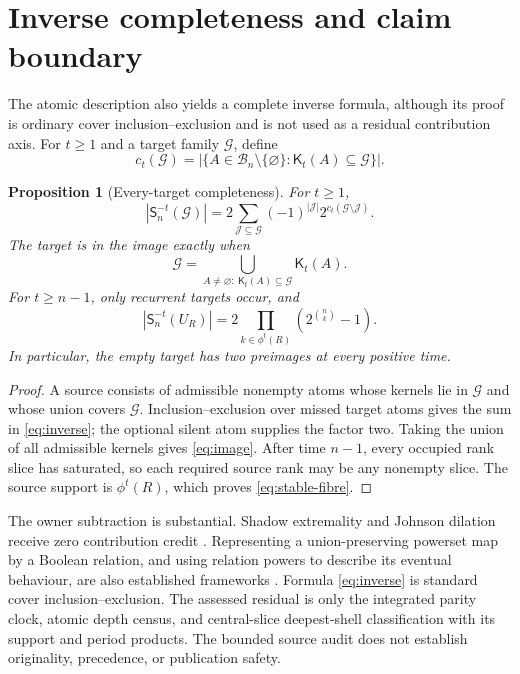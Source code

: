 \documentclass[a4paper,10pt]{amsart}
\newtheorem{proposition}[theorem]{Proposition}
\newcommand{\cB}{\mathcal B}
\newcommand{\cG}{\mathcal G}
\newcommand{\cJ}{\mathcal J}
\newcommand{\cS}{\mathsf S}
\newcommand{\cK}{\mathsf K}
\begin{document}
\section{Inverse completeness and claim boundary}

The atomic description also yields a complete inverse formula, although its
proof is ordinary cover inclusion--exclusion and is not used as a residual
contribution axis.  For $t\geq1$ and a target family $\cG$, define
\[
 c_t(\cG)=|\{A\in\cB_n\setminus\{\varnothing\}:\cK_t(A)\subseteq\cG\}|.
\]

\begin{proposition}[Every-target completeness]\label{prop:inverse}
For $t\geq1$,
\begin{equation}\label{eq:inverse}
 |\cS_n^{-t}(\cG)|=
 2\sum_{\cJ\subseteq\cG}(-1)^{|\cJ|}2^{c_t(\cG\setminus\cJ)}.
\end{equation}
The target is in the image exactly when
\begin{equation}\label{eq:image}
 \cG=\bigcup_{A\neq\varnothing:\ \cK_t(A)\subseteq\cG}\cK_t(A).
\end{equation}
For $t\geq n-1$, only recurrent targets occur, and
\begin{equation}\label{eq:stable-fibre}
 |\cS_n^{-t}(U_R)|=
 2\prod_{k\in\phi^t(R)}\left(2^{\binom nk}-1\right).
\end{equation}
In particular, the empty target has two preimages at every positive time.
\end{proposition}

\begin{proof}
A source consists of admissible nonempty atoms whose kernels lie in $\cG$
and whose union covers $\cG$.  Inclusion--exclusion over missed target atoms
gives the sum in \eqref{eq:inverse}; the optional silent atom supplies the
factor two.  Taking the union of all admissible kernels gives
\eqref{eq:image}.  After time $n-1$, every occupied rank slice has saturated,
so each required source rank may be any nonempty slice.  The source support
is $\phi^t(R)$, which proves \eqref{eq:stable-fibre}.
\end{proof}

The owner subtraction is substantial.  Shadow extremality and Johnson
dilation receive zero contribution credit
\citep{kruskal1963,katona2009,diego2018}.  Representing a union-preserving
powerset map by a Boolean relation, and using relation powers to describe its
eventual behaviour, are also established frameworks
\citep{rosenblatt1957,gregory1993,akin2024}.  Formula \eqref{eq:inverse} is
standard cover inclusion--exclusion.  The assessed residual is only the
integrated parity clock, atomic depth census, and central-slice deepest-shell
classification with its support and period products.  The bounded source
audit does not establish originality, precedence, or publication safety.
\end{document}
